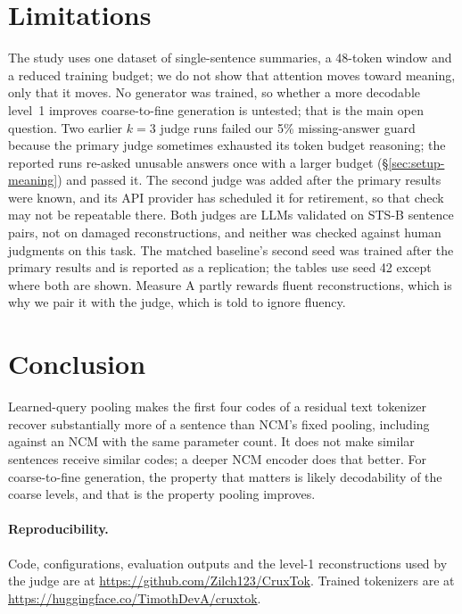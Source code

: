 \documentclass[11pt]{article}
\begin{document}
\section{Limitations}\label{sec:limits}
The study uses one dataset of single-sentence summaries, a 48-token window and a reduced training budget; we do not show that attention moves toward meaning, only that it moves. No generator was trained, so whether a more decodable level~1 improves coarse-to-fine generation is untested; that is the main open question. Two earlier $k{=}3$ judge runs failed our 5\% missing-answer guard because the primary judge sometimes exhausted its token budget reasoning; the reported runs re-asked unusable answers once with a larger budget (\S\ref{sec:setup-meaning}) and passed it. The second judge was added after the primary results were known, and its API provider has scheduled it for retirement, so that check may not be repeatable there. Both judges are LLMs validated on STS-B sentence pairs, not on damaged reconstructions, and neither was checked against human judgments on this task. The matched baseline's second seed was trained after the primary results and is reported as a replication; the tables use seed 42 except where both are shown. Measure A partly rewards fluent reconstructions, which is why we pair it with the judge, which is told to ignore fluency.

\section{Conclusion}
Learned-query pooling makes the first four codes of a residual text tokenizer recover substantially more of a sentence than NCM's fixed pooling, including against an NCM with the same parameter count. It does not make similar sentences receive similar codes; a deeper NCM encoder does that better. For coarse-to-fine generation, the property that matters is likely decodability of the coarse levels, and that is the property pooling improves.

\paragraph{Reproducibility.} Code, configurations, evaluation outputs and the level-1 reconstructions used by the judge are at \url{https://github.com/Zilch123/CruxTok}. Trained tokenizers are at \url{https://huggingface.co/TimothDevA/cruxtok}.



\end{document}
